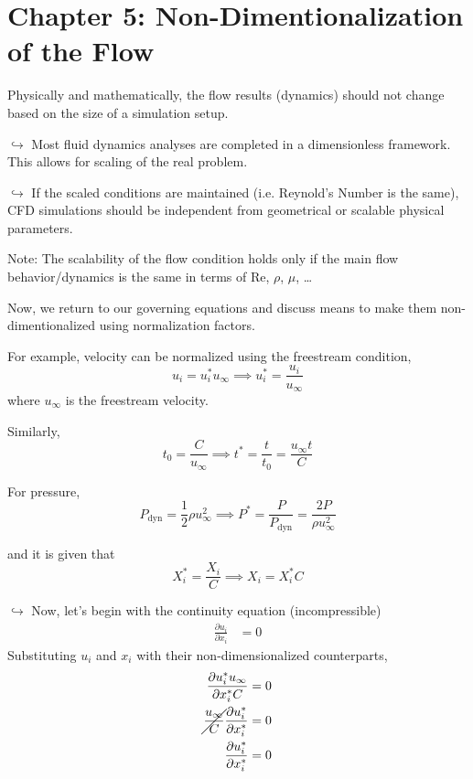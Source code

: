 \section*{Chapter 5: Non-Dimentionalization of the Flow}
Physically and mathematically, the flow results (dynamics) should not change based on the size of a simulation setup.

$\hookrightarrow$ Most fluid dynamics analyses are completed in a dimensionless framework. This allows for scaling of the real problem. 

$\hookrightarrow$ If the scaled conditions are maintained (i.e. Reynold's Number is the same), CFD simulations should be independent from geometrical or scalable physical parameters.

Note: The scalability of the flow condition holds only if the main flow behavior/dynamics is the same in terms of Re, $\rho$, $\mu$, \dots

Now, we return to our governing equations and discuss means to make them non-dimentionalized using normalization factors.

For example, velocity can be normalized using the freestream condition,
\begin{equation*}
    u_i = u_i^* u_{\infty} \implies u_i^* = \frac{u_i}{u_{\infty}}
\end{equation*}
where $u_{\infty}$ is the freestream velocity.

Similarly, 
\begin{equation*}
    t_0 = \frac{C}{u_{\infty}} \implies t^* = \frac{t}{t_0} = \frac{u_{\infty} t}{C}
\end{equation*}

For pressure,
\begin{equation*}
    P_{\text{dyn}} = \frac{1}{2} \rho u_{\infty}^2 \implies P^* = \frac{P}{P_{\text{dyn}}} = \frac{2 P}{\rho u_{\infty}^2}
\end{equation*}

and it is given that 
\begin{equation*}
    X_{i}^* = \frac{X_i}{C} \implies X_i = X_i^* C
\end{equation*}

$\hookrightarrow$ Now, let's begin with the continuity equation (incompressible)
\begin{align*}
    \frac{\partial u_i}{\partial x_i} &= 0 
\end{align*}
Substituting $u_i$ and $x_i$ with their non-dimensionalized counterparts,
\begin{align*}
    \frac{\partial u_i^* u_{\infty}}{\partial x_i^* C} &= 0 \\
    \cancel{\frac{u_{\infty}}{C}} \frac{\partial u_i^*}{\partial x_i^*} &= 0 \\
    \frac{\partial u_i^*}{\partial x_i^*} &= 0
\end{align*}

